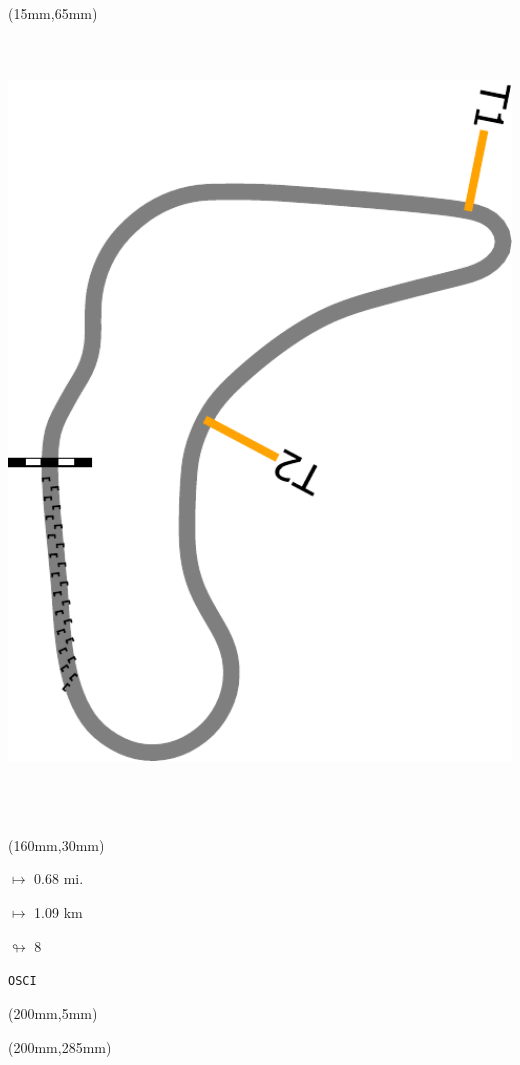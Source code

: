 \begin{textblock*}{185mm}(15mm,65mm)%
\centering
\mbox{\includegraphics[width=185mm,height=210mm,keepaspectratio]{PT/OSCI.pdf}}
\end{textblock*}
\begin{textblock*}{40mm}(160mm,30mm)%
\Large
\par$\mapsto$ 0.68 mi.
\par$\mapsto$ 1.09 km
\par$\looparrowright$ 8
\par\hfill\tiny\tt OSCI\\
\end{textblock*}
\begin{textblock*}{20mm}(200mm,5mm)%
\fbox{\thepage}
\label{OSCI}
\end{textblock*}
\begin{textblock*}{20mm}(200mm,285mm)%
\fbox{\thepage}
\end{textblock*}

